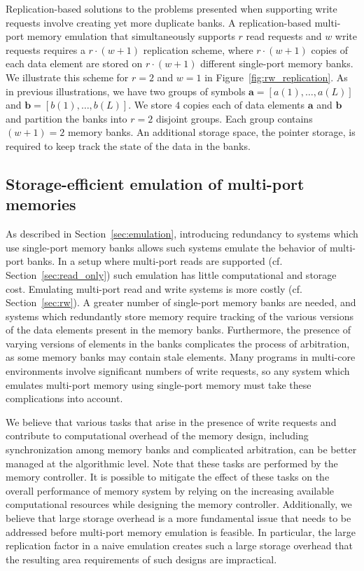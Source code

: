 Replication-based solutions to the problems presented when supporting write requests involve creating yet more duplicate banks. A replication-based multi-port memory emulation that simultaneously supports $r$ read requests and $w$ write requests requires a $r\cdot(w + 1)$ replication scheme, where $r\cdot(w+1)$ copies of each data element are stored on $r\cdot(w + 1)$ different single-port memory banks. We illustrate this scheme for $r = 2$ and $w = 1$ in Figure~\ref{fig:rw_replication}. As in previous illustrations, we have two groups of symbols $\mathbf{a} = [a(1),\ldots, a(L)]$ and $\mathbf{b}  = [b(1),\ldots, b(L)]$. We store $4$ copies each of data elements $\mathbf{a}$ and $\mathbf{b}$ and partition the banks into $r = 2$ disjoint groups. Each group contains $(w + 1) = 2$ memory banks. An additional storage space, the pointer storage, is required to keep track the state of the data in the banks.


\subsection{Storage-efficient emulation of multi-port memories}
\label{sec:efficient_emulation}

As described in Section~\ref{sec:emulation}, introducing redundancy to systems which use single-port memory banks allows such systems emulate the behavior of multi-port banks. In a setup where multi-port reads are supported (cf. Section~\ref{sec:read_only}) such emulation has little computational and storage cost. Emulating multi-port read and write systems is more costly (cf. Section~\ref{sec:rw}). A greater number of single-port memory banks are needed, and systems which redundantly store memory require tracking of the various versions of the data elements present in the memory banks. Furthermore, the presence of varying versions of elements in the banks complicates the process of arbitration, as some memory banks may contain stale elements. Many programs in multi-core environments involve significant numbers of write requests, so any system which emulates multi-port memory using single-port memory must take these complications into account.

We believe that various tasks that arise in the presence of write requests and contribute to computational overhead of the memory design, including synchronization among memory banks and complicated arbitration, can be better managed at the algorithmic level. Note that these tasks are performed by the memory controller. It is possible to mitigate the effect of these tasks on the overall performance of memory system by relying on the increasing available computational resources while designing the memory controller. Additionally, we believe that large storage overhead is a more fundamental issue that needs to be addressed before multi-port memory emulation is feasible. In particular, the large replication factor in a naive emulation creates such a large storage overhead that the resulting area requirements of such designs are impractical.

